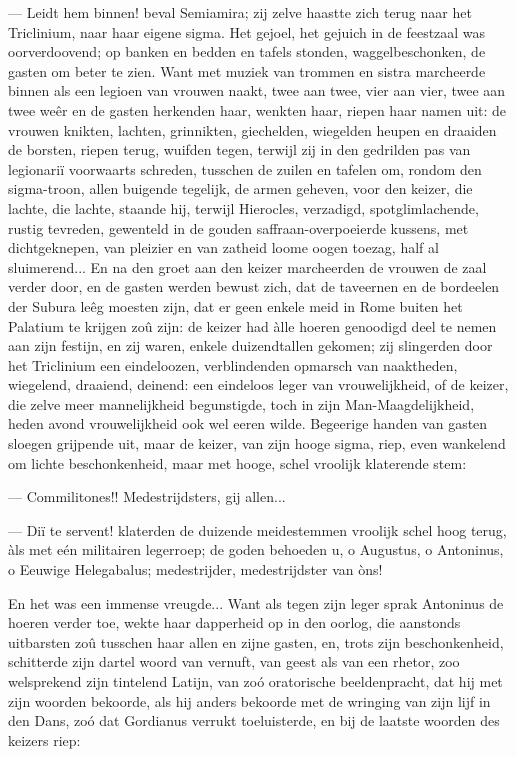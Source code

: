 \documentclass[a4paper, 12pt, oneside, dutch]{article}
\begin{document}
--- Leidt hem binnen! beval Semiamira; zij zelve haastte zich terug naar het Triclinium, naar haar eigene sigma. Het gejoel, het gejuich in de feestzaal was oorverdoovend; op banken en bedden en tafels stonden, waggelbeschonken, de gasten om beter te zien. Want met muziek van trommen en sistra marcheerde binnen als een legioen van vrouwen naakt, twee aan twee, vier aan vier, twee aan twee weêr en de gasten herkenden haar, wenkten haar, riepen haar namen uit: de vrouwen knikten, lachten, grinnikten, giechelden, wiegelden heupen en draaiden de borsten, riepen terug, wuifden tegen, terwijl zij in den gedrilden pas van legionariï voorwaarts schreden, tusschen de zuilen en tafelen om, rondom den sigma-troon, allen buigende tegelijk, de armen geheven, voor den keizer, die lachte, die lachte, staande hij, terwijl Hierocles, verzadigd, spotglimlachende, rustig tevreden, gewenteld in de gouden saffraan-overpoeierde kussens, met dichtgeknepen, van pleizier en van zatheid loome oogen toezag, half al sluimerend... En na den groet aan den keizer marcheerden de vrouwen de zaal verder door, en de gasten werden bewust zich, dat de taveernen en de bordeelen der Subura leêg moesten zijn, dat er geen enkele meid in Rome buiten het Palatium te krijgen zoû zijn: de keizer had àlle hoeren genoodigd deel te nemen aan zijn festijn, en zij waren, enkele duizendtallen gekomen; zij slingerden door het Triclinium een eindeloozen, verblindenden opmarsch van naaktheden, wiegelend, draaiend, deinend: een eindeloos leger van vrouwelijkheid, of de keizer, die zelve meer mannelijkheid begunstigde, toch in zijn Man-Maagdelijkheid, heden avond vrouwelijkheid ook wel eeren wilde. Begeerige handen van gasten sloegen grijpende uit, maar de keizer, van zijn hooge sigma, riep, even wankelend om lichte beschonkenheid, maar met hooge, schel vroolijk klaterende stem:

--- Commilitones!! Medestrijdsters, gij allen...

--- Diï te servent! klaterden de duizende meidestemmen vroolijk schel hoog terug, àls met eén militairen legerroep; de goden behoeden u, o Augustus, o Antoninus, o Eeuwige Helegabalus; medestrijder, medestrijdster van òns!

En het was een immense vreugde... Want als tegen zijn leger sprak Antoninus de hoeren verder toe, wekte haar dapperheid op in den oorlog, die aanstonds uitbarsten zoû tusschen haar allen en zijne gasten, en, trots zijn beschonkenheid, schitterde zijn dartel woord van vernuft, van geest als van een rhetor, zoo welsprekend zijn tintelend Latijn, van zoó oratorische beeldenpracht, dat hij met zijn woorden bekoorde, als hij anders bekoorde met de wringing van zijn lijf in den Dans, zoó dat Gordianus verrukt toeluisterde, en bij de laatste woorden des keizers riep:
\end{document}
